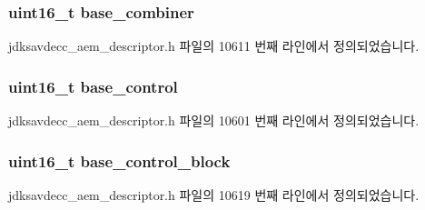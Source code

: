 \subsubsection[{\texorpdfstring{base\+\_\+combiner}{base_combiner}}]{\setlength{\rightskip}{0pt plus 5cm}uint16\+\_\+t base\+\_\+combiner}\hypertarget{structjdksavdecc__descriptor__sensor__unit_afeae9980c36b3e99f2e4b8ab2c31e9d5}{}\label{structjdksavdecc__descriptor__sensor__unit_afeae9980c36b3e99f2e4b8ab2c31e9d5}


jdksavdecc\+\_\+aem\+\_\+descriptor.\+h 파일의 10611 번째 라인에서 정의되었습니다.

\subsubsection[{\texorpdfstring{base\+\_\+control}{base_control}}]{\setlength{\rightskip}{0pt plus 5cm}uint16\+\_\+t base\+\_\+control}\hypertarget{structjdksavdecc__descriptor__sensor__unit_af06eac7dd98377a85258308e8a25e7f2}{}\label{structjdksavdecc__descriptor__sensor__unit_af06eac7dd98377a85258308e8a25e7f2}


jdksavdecc\+\_\+aem\+\_\+descriptor.\+h 파일의 10601 번째 라인에서 정의되었습니다.

\subsubsection[{\texorpdfstring{base\+\_\+control\+\_\+block}{base_control_block}}]{\setlength{\rightskip}{0pt plus 5cm}uint16\+\_\+t base\+\_\+control\+\_\+block}\hypertarget{structjdksavdecc__descriptor__sensor__unit_a9303491ec92ba42c28fb904c14d310b0}{}\label{structjdksavdecc__descriptor__sensor__unit_a9303491ec92ba42c28fb904c14d310b0}


jdksavdecc\+\_\+aem\+\_\+descriptor.\+h 파일의 10619 번째 라인에서 정의되었습니다.

